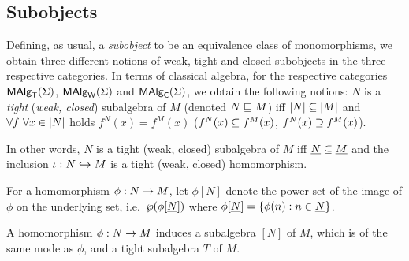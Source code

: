 \documentclass[10pt]{article}
\begin{document}

\subsection{Subobjects}
\label{sub:sub}

Defining, as usual, a {\em subobject\/} to be an equivalence class of
monomorphisms, we obtain three different notions of weak, tight and
closed subobjects in the three respective categories.  In terms of
classical algebra, for the respective categories $\mbox{\rm\sf MAlg}_{\sf T}(\Sigma)$, $\mbox{\rm\sf MAlg}_{\sf W}(\Sigma)$ and
$\mbox{\rm\sf MAlg}_{\sf C}(\Sigma)$, we obtain the following notions: $N$ is a {\em
tight} ({\em weak, closed\/}) subalgebra of $M$ (denoted $N\mathrel{\sqsubseteq} M$)
iff $|N|\subseteq|M|$ and $\forall f\ \forall x\in|N|$
holds $f^N(x)=f^M(x)$ ($f^N(x)\subseteq f^M(x)$, $f^N(x)\supseteq
f^M(x)$).

In other words, $N$ is a tight (weak, closed) subalgebra of $M$ iff
$\underline {N}\subseteq\underline {M}$ and the inclusion $\iota:N\hookrightarrow M$ is a
tight (weak, closed) homomorphism.

For a homomorphism $\phi:N\rightarrow M$, let $\phi[N]$ denote the power set
of the image of $\phi$ on the underlying set, i.e.\ $\wp(\phi[\underline {N}])$ where $\phi[\underline {N}]=\{\phi(n):n\in\underline {N}\}$.


\begin{Prop}
\label{le:subalgs}
A homomorphism $\phi:N\rightarrow M$ induces a subalgebra $[N]$ of $M$,
which is of the same mode as $\phi$, and a tight subalgebra $T$ of
$M$.
\end{Prop}
\end{document}
